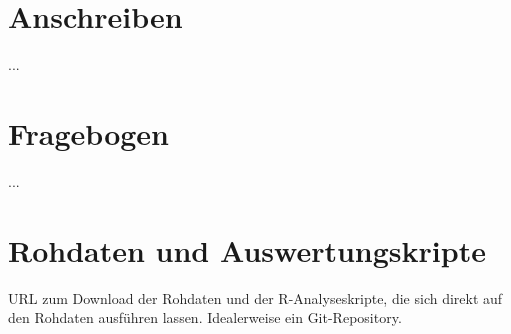 \documentclass[de]{agse-empir-report}\usepackage[]{graphicx}\usepackage[]{color}
\begin{document}
\nocite{*}




\appendix

\section{Anschreiben}

...


\section{Fragebogen}

...


\section{Rohdaten und Auswertungskripte}

URL zum Download der Rohdaten und der R-Analyseskripte, die sich direkt auf den
Rohdaten ausführen lassen.
Idealerweise ein Git-Repository.
\end{document}
